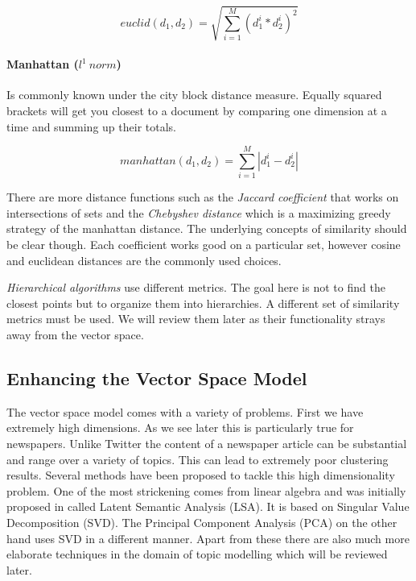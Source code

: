     \begin{equation}
      euclid(d_1, d_2) = \sqrt{\sum_{i=1}^{M}(d_1^i * d_2^i)^2}
    \end{equation}

    \paragraph{Manhattan ($l^1\:norm$)}
    Is commonly known under the city block distance measure. Equally squared brackets
    will get you closest to a document by comparing one dimension at a time and summing up their totals.

    \begin{equation}
      manhattan(d_1, d_2) = \sum_{i=1}^{M}|d_1^i - d_2^i|
    \end{equation}

    There are more distance functions such as the \emph{Jaccard coefficient} that works on intersections of sets and the \emph{Chebyshev distance} which is a maximizing greedy strategy of the manhattan distance. The underlying concepts of similarity should be clear though. Each coefficient works good on a particular set, however cosine and euclidean distances are the commonly used choices.

    \emph{Hierarchical algorithms} use different metrics. The goal here is not to find the closest points but to organize them into hierarchies. A different set of similarity metrics must be used. We will review them later as their functionality strays away from the vector space.

  \subsection{Enhancing the Vector Space Model}

    The vector space model comes with a variety of problems. First we have extremely high dimensions. As we see later this is particularly true for newspapers. Unlike Twitter the content of a newspaper article can be substantial and range over a variety of topics. This can lead to extremely poor clustering results. Several methods have been proposed to tackle this high dimensionality problem. One of the most strickening comes from linear algebra and was initially proposed in \cite{DeerwesterLSI1990} called Latent Semantic Analysis (LSA). It is based on Singular Value Decomposition (SVD). The Principal Component Analysis (PCA) on the other hand uses SVD in a different manner. Apart from these there are also much more elaborate techniques in the domain of topic modelling which will be reviewed later.

